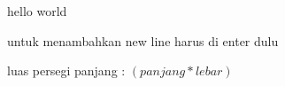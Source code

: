 \documentclass[12pt]{article}
\begin{document}
	hello world

	untuk menambahkan new line harus di enter dulu 
	
	luas persegi panjang : $(panjang * lebar)$
\end{document}
